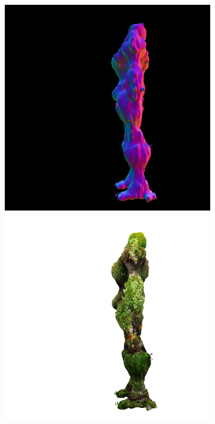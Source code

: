 \begin{figure}[ht]
\begin{subfigure}[b]{0.222\textwidth}
        \includegraphics[width=\textwidth]{etc/a robot made out of plants/magic123/magic123_refine_robot_left_5000_part2.png}
        \includegraphics[width=\textwidth]{etc/a robot made out of plants/magic123/magic123_refine_robot_left_5000_part1.png}

\end{subfigure}
\end{figure}
